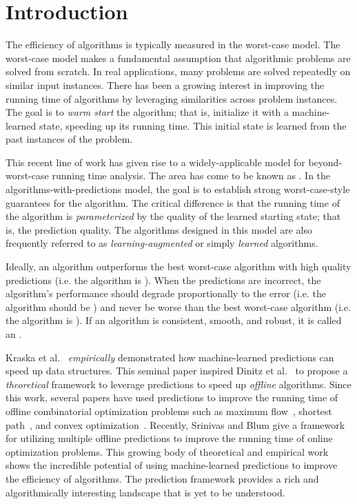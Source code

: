 \section{Introduction}
\label{sec:introduction}
The efficiency of algorithms is typically measured in the worst-case model.  The worst-case model makes a fundamental assumption that algorithmic problems are solved from scratch. In real applications, many problems are solved repeatedly on similar input instances.  There has been a growing interest in improving the running time of algorithms by leveraging similarities across problem instances.  The goal is to \emph{warm start} the algorithm; that is, initialize it with a machine-learned state, speeding up its running time.  This
initial state is learned from the past instances of the problem.   

This recent line of work has given rise to a widely-applicable model for beyond-worst-case running time analysis.   The area has come to be known as . In the algorithms-with-predictions model, the goal is to establish strong worst-case-style guarantees for the algorithm.  The critical difference is that the running time of the algorithm is \emph{parameterized} by the quality of the learned starting state; that is, the prediction quality. The algorithms designed in this model are also frequently referred to as \emph{learning-augmented} or simply \emph{learned} algorithms.

Ideally, an algorithm outperforms the best worst-case algorithm with high quality predictions (i.e. the algorithm is ). When the predictions are incorrect,  the algorithm's performance should degrade proportionally to the error (i.e. the algorithm should be ) and never be worse than the best worst-case algorithm (i.e. the algorithm is ). If an algorithm is consistent, smooth, and robust, it is called an . 

Kraska et al.~\cite{KraskaBCDP18}  \emph{empirically} demonstrated how machine-learned predictions can speed up data structures.  
This seminal paper inspired Dinitz et al.~\cite{DinitzILMV21} to propose a \emph{theoretical} framework to leverage predictions to speed up \emph{offline} algorithms.
Since this work, several papers have used predictions to improve the running time of offline combinatorial optimization problems such as maximum flow~\cite{DaviesMVW,POLAK2024106487}, shortest path~\cite{LattanziSV23}, and convex optimization~\cite{SakaueO22}. Recently, Srinivas and Blum \cite{SrinivasB25} give a framework for utilizing multiple offline predictions to improve the running time of online optimization problems.
This growing body of theoretical and empirical work shows the incredible potential of using machine-learned predictions to improve the efficiency of algorithms. The prediction framework provides a rich and algorithmically interesting landscape that is yet to be understood. 

